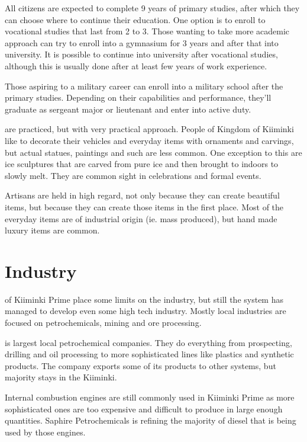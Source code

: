 \documentclass{tufte-book}
\begin{document}
All citizens are expected to complete 9 years of primary studies, after
which they can choose where to continue their education. One option is to
enroll to vocational studies that last from 2 to 3. Those wanting to take more
academic approach can try to enroll into a gymnasium for 3 years and after
that into university. It is possible to continue into university after
vocational studies, although this is usually done after at least few years of
work experience.

Those aspiring to a military career can enroll into a military school after
the primary studies. Depending on their capabilities and performance, they'll
graduate as sergeant major or lieutenant and enter into active duty.

 are practiced, but with very practical approach. People of
Kingdom of Kiiminki like to decorate their vehicles and everyday items with
ornaments and carvings, but actual statues, paintings and such are less
common. One exception to this are ice sculptures that are carved from pure ice
and then brought to indoors to slowly melt. They are common sight in
celebrations and formal events.

Artisans are held in high regard, not only because they can create beautiful
items, but because they can create those items in the first place. Most of the
everyday items are of industrial origin (ie. mass produced), but hand made
luxury items are common.

\chapter{Industry}
\label{ch:industry}

 of Kiiminki Prime place some limits on the
industry, but still the system has managed to develop even some high tech
industry. Mostly local industries are focused on petrochemicals, mining and
ore processing.

 is largest local petrochemical companies.
They do everything from prospecting, drilling and oil processing to more
sophisticated lines like plastics and synthetic products. The company exports
some of its products to other systems, but majority stays in the Kiiminki.

Internal combustion engines are still commonly used in Kiiminki Prime as
more sophisticated ones are too expensive and difficult to produce in large
enough quantities. Saphire Petrochemicals is refining the majority of diesel
that is being used by those engines.
\end{document}
